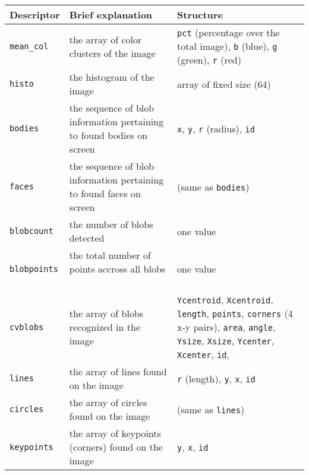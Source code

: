 \begin{table}
\begin{tabular}{ l | p{8cm} |   p{3cm} }

Descriptor & Brief explanation & Structure

\tabularnewline
\hline

\texttt{mean\_col}  & the array of color clusters of the image \
& 
\texttt{pct} (percentage over the total image), 
\texttt{b} (blue), 
\texttt{g} (green), 
\texttt{r} (red)

\tabularnewline
\hline

\texttt{histo}      & the histogram of the image \
& array of fixed size (64)

\tabularnewline
\hline

\texttt{bodies}     & the sequence of blob information pertaining to found bodies on screen \
& 
\texttt{x}, 
\texttt{y}, 
\texttt{r} (radius), 
\texttt{id}

\tabularnewline
\hline

\texttt{faces}      & the sequence of blob information pertaining to found faces on screen \
& (same as \texttt{bodies})

\tabularnewline
\hline

\texttt{blobcount}  & the number of blobs detected \
& one value

\tabularnewline
\hline

\texttt{blobpoints} & the total number of points accross all blobs \
& one value

\tabularnewline
\hline

\texttt{cvblobs}    & the array of blobs recognized in the image \ 
& 
\texttt{Ycentroid}, 
\texttt{Xcentroid}, 
\texttt{length}, 
\texttt{points}, 
\texttt{corners} (4 x-y pairs), 
\texttt{area}, 
\texttt{angle}, 
\texttt{Ysize}, 
\texttt{Xsize}, 
\texttt{Ycenter}, 
\texttt{Xcenter}, 
\texttt{id}, 

\tabularnewline
\hline

\texttt{lines}      & the array of lines found on the image \
& 
\texttt{r} (length), 
\texttt{y}, 
\texttt{x}, 
\texttt{id}

\tabularnewline
\hline

\texttt{circles}    & the array of circles found on the image \
& (same as \texttt{lines})

\tabularnewline
\hline

\texttt{keypoints}  & the array of keypoints (corners) found on the image \
& 
\texttt{y},  
\texttt{x}, 
\texttt{id} 


\end{tabular}
\end{table}



